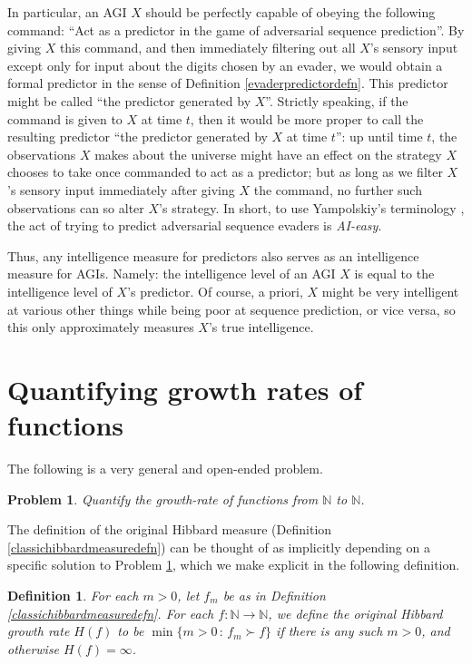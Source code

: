 \documentclass{article}
\newtheorem{definition}[theorem]{Definition}
\newtheorem{problem}[theorem]{Problem}
\begin{document}
In particular, an AGI $X$ should be perfectly capable of obeying the following command:
``Act as a predictor in the game of adversarial sequence prediction''.
By giving $X$ this command, and then immediately filtering out all $X$'s
sensory input except only for input about the digits chosen by an evader,
we would obtain a formal predictor in the sense of Definition \ref{evaderpredictordefn}.
This predictor might be called ``the predictor generated by $X$''. Strictly speaking,
if the command is given to $X$ at time $t$, then it would be more proper to call
the resulting predictor ``the predictor generated by $X$ at time $t$'': up until
time $t$, the observations $X$ makes about the universe might have an effect on
the strategy $X$ chooses to take once commanded to act as a predictor; but as long
as we filter $X$'s sensory input immediately after giving $X$ the command, no
further such observations can so alter $X$'s strategy.
In short, to use Yampolskiy's terminology \cite{yampolskiy2012ai}, the act of
trying to predict adversarial sequence evaders is \emph{AI-easy}.

Thus, any intelligence measure for predictors also serves as an intelligence
measure for AGIs. Namely: the intelligence level of an AGI $X$ is equal to the
intelligence level of $X$'s predictor. Of course, a priori,
$X$ might be very intelligent at various other things while being poor
at sequence prediction, or vice versa, so this only
approximately measures $X$'s true intelligence.


\section{Quantifying growth rates of functions}
\label{growthratesection}

The following is a very general and open-ended problem.

\begin{problem}
\label{bigoproblem}
    Quantify the growth-rate of functions from $\mathbb N$ to $\mathbb N$.
\end{problem}

The definition of the original Hibbard measure
(Definition \ref{classichibbardmeasuredefn})
can be thought of as implicitly depending on a specific solution to Problem
\ref{bigoproblem}, which we make explicit in the following definition.

\begin{definition}
\label{hibbardgrowthratedefn}
    For each $m>0$, let $f_m$ be as in Definition \ref{classichibbardmeasuredefn}.
    For each $f:\mathbb N\to\mathbb N$, we define the \emph{original Hibbard growth rate}
    $H(f)$ to be $\min\{m>0\,:\,f_m\succ f\}$ if there is any such $m>0$, and otherwise
    $H(f)=\infty$.
\end{definition}
\end{document}

